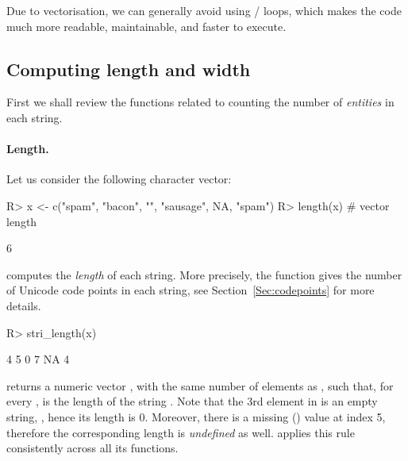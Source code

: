 \documentclass[nojss]{jss}\usepackage[]{graphicx}\usepackage[]{color}
\newcommand{\strq}[1]{\code{{"{}#1"{}}}}
\begin{document}
\noindent
Due to {vectorisation}, we can generally
avoid using / loops,
which makes the code much more readable, maintainable, and faster to execute.





\subsection{Computing length and width}


First we shall review the functions related to counting
the number of \textit{entities} in each string.



\paragraph{Length.}
Let us consider the following character vector:

\begin{Schunk}
\begin{Sinput}
R> x <- c("spam", "bacon", "", "sausage", NA, "spam")
R> length(x)        # vector length
\end{Sinput}
\begin{Soutput}
[1] 6
\end{Soutput}
\end{Schunk}


 computes the \textit{length}
of each string.
More precisely,
the function gives the number of Unicode code points in each string,
see Section~\ref{Sec:codepoints} for more details.

\begin{Schunk}
\begin{Sinput}
R> stri_length(x)
\end{Sinput}
\begin{Soutput}
[1]  4  5  0  7 NA  4
\end{Soutput}
\end{Schunk}

\noindent
{} returns a numeric vector ,
with the same number of elements as , such that, for every ,
 is the length of the string .
Note that the 3rd element in  is an empty string, \strq{},
hence its length is  0.
Moreover, there is a missing () value
at index 5, therefore the corresponding length is \textit{undefined} as well.
 applies this rule consistently across all its functions.
\end{document}
